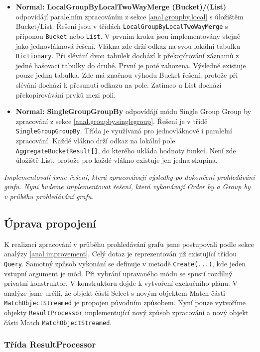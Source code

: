 \begin{itemize}
\item \textbf{Normal: LocalGroupByLocalTwoWayMerge (Bucket)}\textbf{/(List)} odpovídájí paralelním zpracováním z sekce \ref{anal.groupby.local} s úložištěm Bucket/List.
Řešení jsou v třídách \texttt{LocalGroupByLocalTwoWayMerge} s příponou \texttt{Bucket} nebo \texttt{List}.
V prvním kroku jsou implementovány stejně jako jednovláknová řešení.
Vlákna zde drží odkaz na svou lokální tabulku \texttt{Dictionary}.
Při slévání dvou tabulek dochází k překopírování záznamů z jedné hašovací tabulky do druhé.
První je poté zahozena.
Výsledně existuje pouze jedna tabulka. 
Zde má značnou výhodu Bucket řešení, protože při slévání dochází k přesunutí odkazu na pole.
Zatímco u List dochází překopírovávání prvků mezi poli. 

\item \textbf{Normal: SingleGroupGroupBy} odpovídájí módu Single Group Group by zpracování z sekce \ref{anal.groupby.singlegroup}.
Řešení je v třídě \texttt{SingleGroupGroupBy}.
Třída je využívaná pro jednovláknové i paralelní zpracování.
Každé vlákno drží odkaz na lokální pole \texttt{AggregateBucketResult[]}, do kterého ukláda hodnoty funkcí.
Není zde úložiště List, protože pro každé vlákno existuje jen jedna skupina.

\end{itemize}
\textit{Implementovali jsme řešení, která zpracovávají výsledky po dokončení prohledávání grafu.
Nyní budeme implementovat řešení, která vykonávají Order by a Group by v průběhu prohledávání grafu.}

\subsection{Úprava propojení}

K realizaci zpracování v průběhu prohledávání grafu jsme postupovali podle sekce analýzy \ref{anal.improvement}.
Celý dotaz je reprezentován již existující třídou \texttt{Query}.
Samotný způsob vykonání se definuje v metodě \texttt{Create(...)}, kde jeden vstupní argument je mód.
Při vybrání upravaného módu se spustí rozdílný privatní konstruktor.
V konstruktoru dojde k vytvoření exekučního plánu.
V analýze jsme určili, že objekt části Select s novým objektem Match části \texttt{MatchObjectStreamed} je propojen původním způsobem.
Nyní pouze vytvoříme objekty \texttt{ResultProcessor} implementující nový způsob zpracování a nový objekt části Match \texttt{MatchObjectStreamed}. 

\subsubsection{Třída ResultProcessor}

